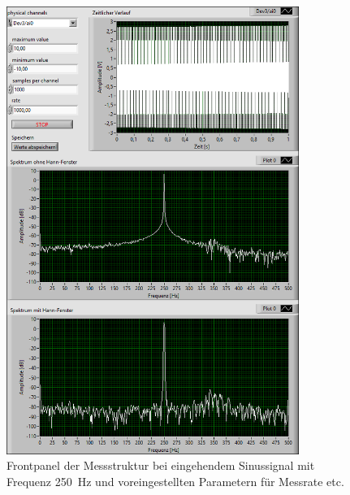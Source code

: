 		\begin{figure}[H]
			\centering
			\includegraphics[width=0.85\textwidth]{pic/abtast_250Hz.png}	
			\caption{Frontpanel der Messstruktur bei eingehendem Sinussignal mit Frequenz \SI{250}{\hertz} und voreingestellten Parametern für Messrate etc.}
			\label{fig:abtast_250Hz}
		\end{figure}
	
